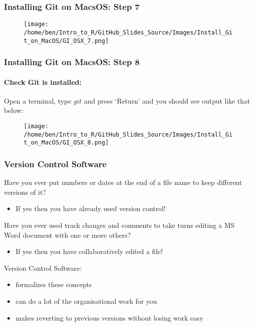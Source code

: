 \documentclass[xcolor=dvipsnames]{beamer}
\begin{document}
\begin{frame}
\frametitle{Installing Git on MacsOS: Step 7}
\begin{center}
\begin{figure}
\texttt{[image: /home/ben/Intro\_to\_R/GitHub\_Slides\_Source/Images/Install\_Git\_on\_MacOS/GI\_OSX\_7.png]}
\end{figure}
\end{center}
\end{frame}

\begin{frame}
\frametitle{Installing Git on MacsOS: Step 8}
\framesubtitle{Check Git is installed:}
Open a terminal, type $git$ and press `Return' and you should see output like that below:
\begin{center}
\begin{figure}
\texttt{[image: /home/ben/Intro\_to\_R/GitHub\_Slides\_Source/Images/Install\_Git\_on\_MacOS/GI\_OSX\_8.png]}
\end{figure}
\end{center}
\end{frame}

\begin{frame}
\frametitle{Version Control Software}
Have you ever put numbers or dates at the end of a file name to keep different versions of it? 
\begin{itemize} 
\item If yes then you have already used version control!
\newline
\newline
\end{itemize}

Have you ever used track changes and comments to take turns editing a  MS Word document with one or more others?
\begin{itemize}
\item If yes then you have collaboratively edited a file!
\newline
\newline
\end{itemize}

Version Control Software: 
\begin{itemize} 
\item formalizes these concepts
\item can do a lot of the organisational work for you
\item makes reverting to previous versions without losing work easy 
\end{itemize}
 
\end{frame}
\end{document}
